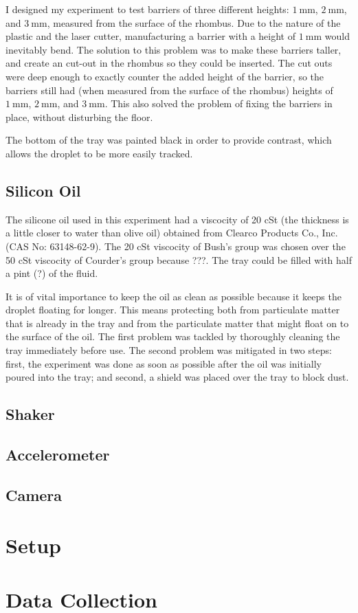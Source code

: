 I designed my experiment to test barriers of three different heights: $1~\mathrm{mm}$, $2~\mathrm{mm}$, and $3~\mathrm{mm}$, measured from the surface of the rhombus. Due to the nature of the plastic and the laser cutter, manufacturing a barrier with a height of $1~\mathrm{mm}$ would inevitably bend. The solution to this problem was to make these barriers taller, and create an cut-out in the rhombus so they could be inserted. The cut outs were deep enough to exactly counter the added height of the barrier, so the barriers still had (when measured from the surface of the rhombus) heights of $1~\mathrm{mm}$, $2~\mathrm{mm}$, and $3~\mathrm{mm}$. This also solved the problem of fixing the barriers in place, without disturbing the floor. 


The bottom of the tray was painted black in order to provide contrast, which allows the droplet to be more easily tracked.





\subsection{Silicon Oil}
    The silicone oil used in this experiment had a viscocity of 20 cSt (the thickness is a little closer to water than olive oil) obtained from Clearco Products Co., Inc. (CAS No: 63148-62-9). The 20 cSt viscocity of Bush's group was chosen over the 50 cSt viscocity of Courder's group because ???. The tray could be filled with half a pint (?) of the fluid.
    
    It is of vital importance to keep the oil as clean as possible because it keeps the droplet floating for longer. This means protecting both from particulate matter that is already in the tray and from the particulate matter that might float on to the surface of the oil. The first problem was tackled by thoroughly cleaning the tray immediately before use. The second problem was mitigated in two steps: first, the experiment was done as soon as possible after the oil was initially poured into the tray; and second, a shield was placed over the tray to block dust.     

\subsection{Shaker}

\subsection{Accelerometer}  
      

\subsection{Camera}    
 
\section{Setup}

\section{Data Collection}

